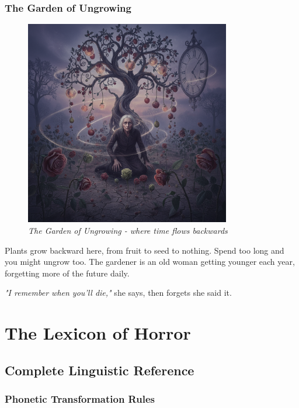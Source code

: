 \documentclass[11pt,a4paper,twoside]{book}
\begin{document}
\section{The Garden of Ungrowing}

\begin{figure}[h]
\centering
\includegraphics[width=0.8\textwidth]{images/garden_ungrowing_2025-09-03T22-32-01-868Z_1.png}
\caption*{\textit{The Garden of Ungrowing - where time flows backwards}}
\end{figure}

Plants grow backward here, from fruit to seed to nothing. Spend too long and you might ungrow too. The gardener is an old woman getting younger each year, forgetting more of the future daily.

\textit{"I remember when you'll die,"} she says, then forgets she said it.

\part{The Lexicon of Horror}

\chapter{Complete Linguistic Reference}

\section{Phonetic Transformation Rules}
\end{document}
